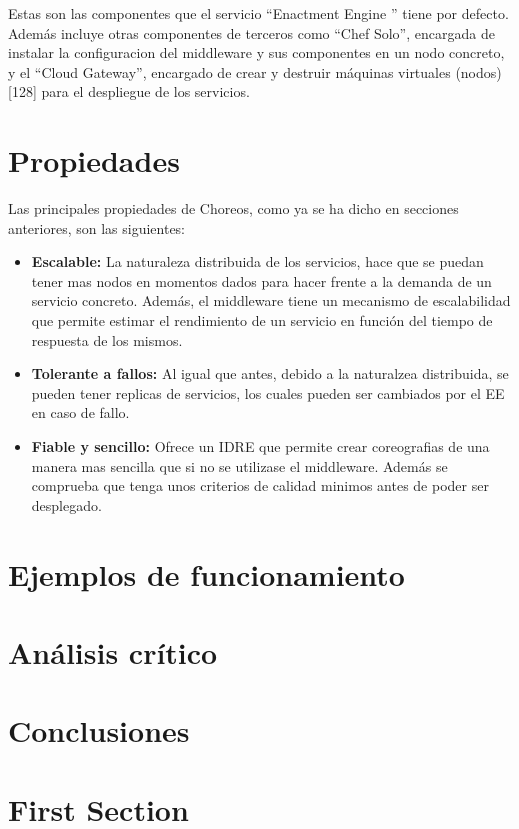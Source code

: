 \documentclass[runningheads]{llncs}
\begin{document}
Estas son las componentes que el servicio ``Enactment Engine '' tiene por defecto. Además incluye otras componentes de terceros como ``Chef Solo'', encargada de instalar la configuracion del middleware y sus componentes en un nodo concreto, y el ``Cloud Gateway'', encargado de crear y destruir máquinas virtuales (nodos)[128] para el despliegue de los servicios.

\section{Propiedades}
Las principales propiedades de Choreos, como ya se ha dicho en secciones anteriores, son las siguientes:

\begin{itemize}
    \item \textbf{Escalable: }La naturaleza distribuida de los servicios, hace que se puedan tener mas nodos en momentos dados para hacer frente a la demanda de un servicio concreto. Además, el middleware tiene un mecanismo de escalabilidad que permite estimar el rendimiento de un servicio en función del tiempo de respuesta de los mismos.
    \item \textbf{Tolerante a fallos: }Al igual que antes, debido a la naturalzea distribuida, se pueden tener replicas de servicios, los cuales pueden ser cambiados por el EE en caso de fallo.
    \item \textbf{Fiable y sencillo: }Ofrece un IDRE que permite crear coreografias de una manera mas sencilla que si no se utilizase el middleware. Además se comprueba que tenga unos criterios de calidad minimos antes de poder ser desplegado.
\end{itemize}
\section{Ejemplos de funcionamiento}
\section{Análisis crítico}
\section{Conclusiones}
\section{First Section}
\end{document}
